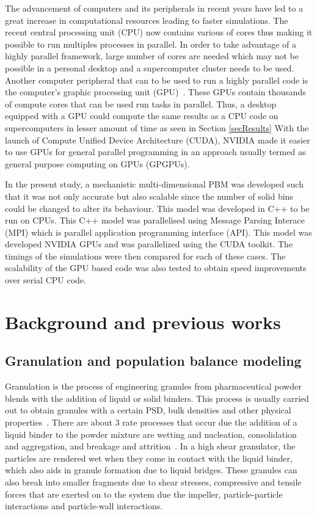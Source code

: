 \documentclass[preprint,10pt,authoryear]{elsarticle}
\begin{document}
\begin{linenumbers}
The advancement of computers and its peripherals in recent years have led to a great increase in 
computational resources leading to faster simulations. The recent central processing unit (CPU) 
now contains various of cores thus making it possible to run multiples processes in parallel. 
In order to take advantage of a highly parallel framework, large number of cores are needed 
which may not be possible in a personal desktop and a supercomputer cluster needs to be used.
Another computer peripheral that can to be used to run a highly parallel code is the computer's 
graphic processing unit (GPU)~\citep{Prakash2013b}. These GPUs contain thousands of compute 
cores that can be used run tasks in parallel. Thus, a desktop equipped with a GPU could 
compute the same results as a CPU code on supercomputers in lesser amount of time as seen in Section \ref{secResults}
With the launch of Compute Unified Device Architecture (CUDA), NVIDIA made it easier to use GPUs for 
general parallel programming in an approach usually termed as general purpose computing on GPUs (GPGPUs).

In the present study, a mechanistic multi-dimensional PBM was developed such that it was not 
only accurate but also scalable since the number of solid bins could be changed to alter its 
behaviour. This model was developed in C++ to be run on CPUs. This C++ model was parallelised 
using Message Parsing Interace (MPI) which is parallel application programming interface (API). 
This model was developed NVIDIA GPUs and was parallelized using the CUDA toolkit. The timings of 
the simulations were then compared for each of these cases. The scalability of the GPU based code 
was also tested to obtain speed improvements over serial CPU code.


\section{Background and previous works}
\label{secBkgd}
\subsection{Granulation and population balance modeling}
Granulation is the process of engineering granules from pharmaceutical powder blends 
with the addition of liquid or solid binders. This process is usually carried out 
to obtain granules with a certain PSD,  bulk densities and other physical properties~\citep{Barrasso2015cerd}.
There are about 3 rate processes that occur due the addition of a liquid binder to the 
powder mixture are wetting and nucleation, consolidation and aggregation, and breakage 
and attrition~\citep{sen2014}. In a high shear granulator, the particles are rendered wet 
when they come in contact with the liquid binder, which also aids in granule formation due to 
liquid bridges. These granules can also break into smaller fragments due to shear stresses, 
compressive and tensile forces that are exerted on to the system due the impeller, 
particle-particle interactions and particle-wall interactions.


\end{linenumbers}
\end{document}
